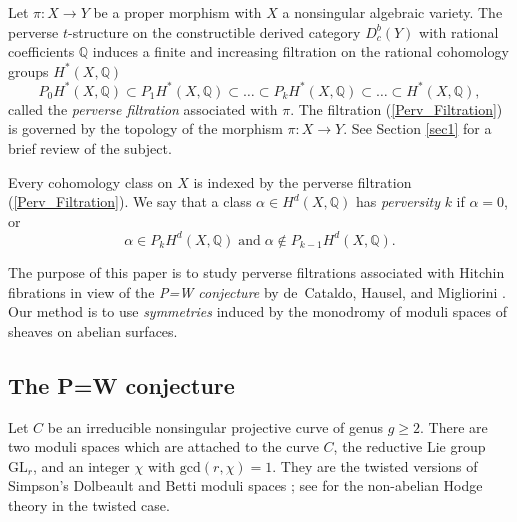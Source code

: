 \documentclass[11pt]{amsart}
\theoremstyle{plain}
\theoremstyle{definition}
\theoremstyle{remark}
\newcommand{\BQ}{{\mathbb{Q}}}
\begin{document}
Let $\pi: X \rightarrow Y$ be a proper morphism with $X$ a nonsingular algebraic variety. The perverse $t$-structure on the constructible derived category $D_c^b(Y)$ with rational coefficients $\BQ$ induces a finite and  increasing filtration on the rational cohomology groups $H^*(X, \BQ)$
\begin{equation} \label{Perv_Filtration}
    P_0H^\ast(X, \BQ) \subset P_1H^\ast(X, \BQ) \subset \dots \subset P_kH^\ast(X, \BQ) \subset \dots \subset H^\ast(X, \BQ),
\end{equation}
called the \emph{perverse filtration} associated with $\pi$. The filtration (\ref{Perv_Filtration}) is governed by the topology of the morphism $\pi: X\rightarrow Y$. See Section \ref{sec1} for a brief review of the subject.

Every cohomology class on $X$ is indexed by the perverse filtration (\ref{Perv_Filtration}). We say that a class $\alpha \in H^d(X, \BQ)$ has \emph{perversity} $k$ if $\alpha = 0$, or
\[
\alpha \in P_kH^d(X, \BQ) \; \mathrm{and} \;  \alpha \notin P_{k-1}H^d(X, \BQ).
\]


The purpose of this paper is to study perverse filtrations associated with Hitchin fibrations in view of the \emph{P=W conjecture} by de~Cataldo, Hausel, and Migliorini \cite{dCHM1}. Our method is to use \emph{symmetries} induced by the monodromy of moduli spaces of sheaves on abelian surfaces.

\subsection{The P=W conjecture} 
Let $C$ be an irreducible  nonsingular  projective curve of genus $g \geq 2$. There are two moduli spaces which are attached to the curve $C$, the reductive Lie group $\mathrm{GL}_r$, and an integer $\chi$ with $\mathrm{gcd}(r,\chi)=1$.  
They are the twisted versions of Simpson's Dolbeault and Betti moduli spaces \cite{Si1994II}; see \cite{HT1} for  the non-abelian Hodge theory in the twisted  case.
\end{document}
